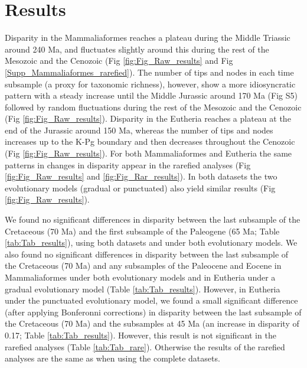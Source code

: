 %
%

\section{Results}
Disparity in the Mammaliaformes reaches a plateau during the Middle Triassic around 240 Ma, and fluctuates slightly around this during the rest of the Mesozoic and the Cenozoic (Fig \ref{fig:Fig_Raw_results} and Fig \ref{Supp_Mammaliaformes_rarefied}).
The number of tips and nodes in each time subsample (a proxy for taxonomic richness), however, show a more idiosyncratic pattern with a steady increase until the Middle Jurassic around 170 Ma (Fig S5) followed by random fluctuations during the rest of the Mesozoic and the Cenozoic (Fig \ref{fig:Fig_Raw_results}).
Disparity in the Eutheria reaches a plateau at the end of the Jurassic around 150 Ma, whereas the number of tips and nodes increases up to the K-Pg boundary and then decreases throughout the Cenozoic (Fig \ref{fig:Fig_Raw_results}).
For both Mammaliaformes and Eutheria the same patterns in changes in disparity appear in the rarefied analyses (Fig \ref{fig:Fig_Raw_results} and \ref{fig:Fig_Rar_results}).
In both datasets the two evolutionary models (gradual or punctuated) also yield similar results (Fig \ref{fig:Fig_Raw_results}).

We found no significant differences in disparity between the last subsample of the Cretaceous (70 Ma) and the first subsample of the Paleogene (65 Ma; Table \ref{tab:Tab_results}), using both datasets and under both evolutionary models. 
We also found no significant differences in disparity between the last subsample of the Cretaceous (70 Ma) and any subsamples of the Paleocene and Eocene in Mammaliaformes under both evolutionary models and in Eutheria under a gradual evolutionary model (Table \ref{tab:Tab_results}).
However, in Eutheria under the punctuated evolutionary model, we found a small significant difference (after applying Bonferonni corrections) in disparity between the last subsample of the Cretaceous (70 Ma) and the subsamples at 45 Ma (an increase in disparity of 0.17; Table \ref{tab:Tab_results}).
However, this result is not significant in the rarefied analyses (Table \ref{tab:Tab_rare}). 
Otherwise the results of the rarefied analyses are the same as when using the complete datasets. 

